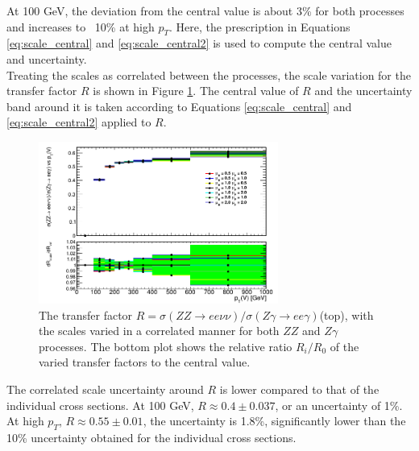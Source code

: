 \documentclass[11pt,a4paper,openright,twoside]{report}
\begin{document}
At 100 GeV, the deviation from the central value is about 3\% for both processes and increases to ~10\% at high $p_T$. Here, the prescription in Equations \ref{eq:scale_central} and \ref{eq:scale_central2} is used to compute the central value and uncertainty.\\ Treating the scales as correlated between the processes, the scale variation for the transfer factor $R$ is shown in Figure \ref{fig:R_scale}. The central value of $R$ and the uncertainty band around it is taken according to Equations \ref{eq:scale_central} and \ref{eq:scale_central2} applied to $R$.
\begin{figure}[H]
\centering
\includegraphics[width=0.7\textwidth]{R_scale.png}
\caption{The transfer factor $R = \sigma(ZZ\to ee\nu\nu)/\sigma(Z\gamma\to ee\gamma)$(top), with the scales varied in a correlated manner for both $ZZ$ and $Z\gamma$ processes. The bottom plot shows the relative ratio $R_i/R_0$ of the varied transfer factors to the central value.}
\label{fig:R_scale}
\end{figure}
The correlated scale uncertainty around $R$ is lower compared to that of the individual cross sections. At 100 GeV, $R \approx 0.4 \pm 0.037$, or an uncertainty of 1\%. At high $p_T$, $R\approx 0.55 \pm 0.01$, the uncertainty is 1.8\%, significantly lower than the 10\% uncertainty obtained for the individual cross sections.
\end{document}
